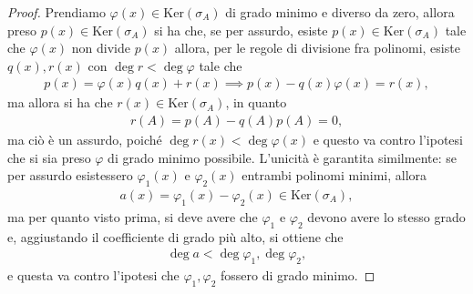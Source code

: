 \begin{proof}
    Prendiamo $\varphi(x) \in \text{Ker}(\sigma_A)$ di grado minimo e diverso da zero, allora preso $p(x) \in \text{Ker}(\sigma_A)$ si ha che, se per assurdo, esiste $p(x) \in \text{Ker}(\sigma_A)$ tale che $\varphi(x)$ non divide $p(x)$ allora, per le regole di divisione fra polinomi, esiste $q(x), r(x)$ con $\deg{r} < \deg{\varphi}$ tale che
    \begin{align}
        p(x) = \varphi(x) q(x) + r(x) \implies p(x) - q(x) \varphi(x) = r(x),
    \end{align}
    ma allora si ha che $r(x) \in \text{Ker}(\sigma_A)$, in quanto
    \begin{align}
        r(A) = p(A) - q(A) p(A) = 0,
    \end{align}
    ma ciò è un assurdo, poiché $\deg{r(x)} < \deg{\varphi(x)}$ e questo va contro l'ipotesi che si sia preso $\varphi$ di grado minimo possibile. L'unicità è garantita similmente: se per assurdo esistessero $\varphi_1(x)$ e $\varphi_2(x)$ entrambi polinomi minimi, allora
    \begin{align}
        a(x) = \varphi_1(x) - \varphi_2(x) \in \text{Ker}(\sigma_A),
    \end{align}
    ma per quanto visto prima, si deve avere che $\varphi_1$ e $\varphi_2$ devono avere lo stesso grado e, aggiustando il coefficiente di grado più alto, si ottiene che
    \begin{align}
        \deg{a} < \deg{\varphi_1}, \deg{\varphi_2},
    \end{align}
    e questa va contro l'ipotesi che $\varphi_1, \varphi_2$ fossero di grado minimo.
\end{proof}

